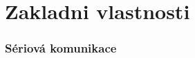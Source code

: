 \section{\texorpdfstring{Zakladni vlastnosti}{Zakladni vlastnosti}}

	\begin{frame}
    \frametitle{Sériová komunikace}

	\end{frame}
  
